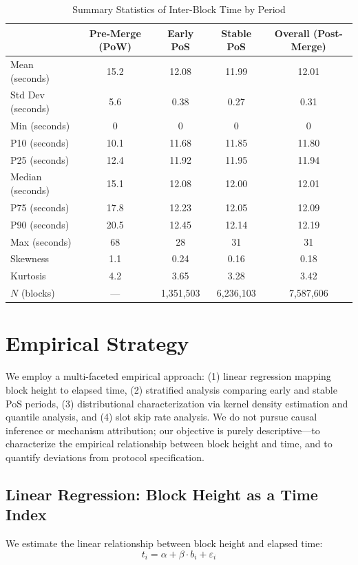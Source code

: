 \documentclass[12pt]{article}
\begin{document}
\begin{table}[h]
\centering
\caption{Summary Statistics of Inter-Block Time by Period}
\label{tab:summary}
\begin{tabular}{lcccc}
\toprule
& Pre-Merge (PoW) & Early PoS & Stable PoS & Overall (Post-Merge) \\
\midrule
Mean (seconds) & 15.2 & 12.08 & 11.99 & 12.01 \\
Std Dev (seconds) & 5.6 & 0.38 & 0.27 & 0.31 \\
Min (seconds) & 0 & 0 & 0 & 0 \\
P10 (seconds) & 10.1 & 11.68 & 11.85 & 11.80 \\
P25 (seconds) & 12.4 & 11.92 & 11.95 & 11.94 \\
Median (seconds) & 15.1 & 12.08 & 12.00 & 12.01 \\
P75 (seconds) & 17.8 & 12.23 & 12.05 & 12.09 \\
P90 (seconds) & 20.5 & 12.45 & 12.14 & 12.19 \\
Max (seconds) & 68 & 28 & 31 & 31 \\
Skewness & 1.1 & 0.24 & 0.16 & 0.18 \\
Kurtosis & 4.2 & 3.65 & 3.28 & 3.42 \\
$N$ (blocks) & — & 1,351,503 & 6,236,103 & 7,587,606 \\
\bottomrule
\end{tabular}
\end{table}

\section{Empirical Strategy}

We employ a multi-faceted empirical approach: (1) linear regression mapping block height to elapsed time, (2) stratified analysis comparing early and stable PoS periods, (3) distributional characterization via kernel density estimation and quantile analysis, and (4) slot skip rate analysis. We do not pursue causal inference or mechanism attribution; our objective is purely descriptive—to characterize the empirical relationship between block height and time, and to quantify deviations from protocol specification.

\subsection{Linear Regression: Block Height as a Time Index}

We estimate the linear relationship between block height and elapsed time:
\begin{equation}
t_i = \alpha + \beta \cdot b_i + \varepsilon_i
\label{eq:linear}
\end{equation}
\end{document}
